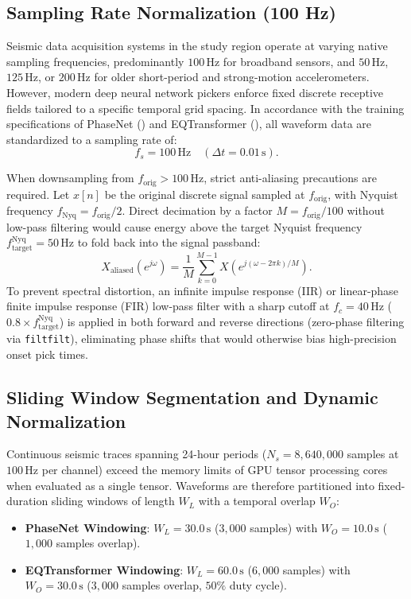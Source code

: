 \subsection{Sampling Rate Normalization (100 Hz)}
\label{subsec:sampling_rate}
Seismic data acquisition systems in the study region operate at varying native sampling frequencies, predominantly $100\,\mathrm{Hz}$ for broadband sensors, and $50\,\mathrm{Hz}$, $125\,\mathrm{Hz}$, or $200\,\mathrm{Hz}$ for older short-period and strong-motion accelerometers. However, modern deep neural network pickers enforce fixed discrete receptive fields tailored to a specific temporal grid spacing. In accordance with the training specifications of PhaseNet (\cite{PhaseNet}) and EQTransformer (\cite{EQTransformer}), all waveform data are standardized to a sampling rate of:
\begin{equation}
  f_s = 100\,\mathrm{Hz} \quad (\Delta t = 0.01\,\mathrm{s}).
\end{equation}

When downsampling from $f_{\mathrm{orig}} > 100\,\mathrm{Hz}$, strict anti-aliasing precautions are required. Let $x[n]$ be the original discrete signal sampled at $f_{\mathrm{orig}}$, with Nyquist frequency $f_{\mathrm{Nyq}} = f_{\mathrm{orig}}/2$. Direct decimation by a factor $M = f_{\mathrm{orig}} / 100$ without low-pass filtering would cause energy above the target Nyquist frequency $f_{\mathrm{target}}^{\mathrm{Nyq}} = 50\,\mathrm{Hz}$ to fold back into the signal passband:
\begin{equation}
  X_{\mathrm{aliased}}(e^{j\omega}) = \frac{1}{M} \sum_{k=0}^{M-1} X\left(e^{j(\omega - 2\pi k)/M}\right).
\end{equation}
To prevent spectral distortion, an infinite impulse response (IIR) or linear-phase finite impulse response (FIR) low-pass filter with a sharp cutoff at $f_c = 40\,\mathrm{Hz}$ ($0.8 \times f_{\mathrm{target}}^{\mathrm{Nyq}}$) is applied in both forward and reverse directions (zero-phase filtering via \texttt{filtfilt}), eliminating phase shifts that would otherwise bias high-precision onset pick times.

\subsection{Sliding Window Segmentation and Dynamic Normalization}
Continuous seismic traces spanning 24-hour periods ($N_s = 8{,}640{,}000$ samples at $100\,\mathrm{Hz}$ per channel) exceed the memory limits of GPU tensor processing cores when evaluated as a single tensor. Waveforms are therefore partitioned into fixed-duration sliding windows of length $W_L$ with a temporal overlap $W_O$:
\begin{itemize}
  \item \textbf{PhaseNet Windowing}: $W_L = 30.0\,\mathrm{s}$ ($3{,}000$ samples) with $W_O = 10.0\,\mathrm{s}$ ($1{,}000$ samples overlap).
  \item \textbf{EQTransformer Windowing}: $W_L = 60.0\,\mathrm{s}$ ($6{,}000$ samples) with $W_O = 30.0\,\mathrm{s}$ ($3{,}000$ samples overlap, $50\%$ duty cycle).
\end{itemize}

